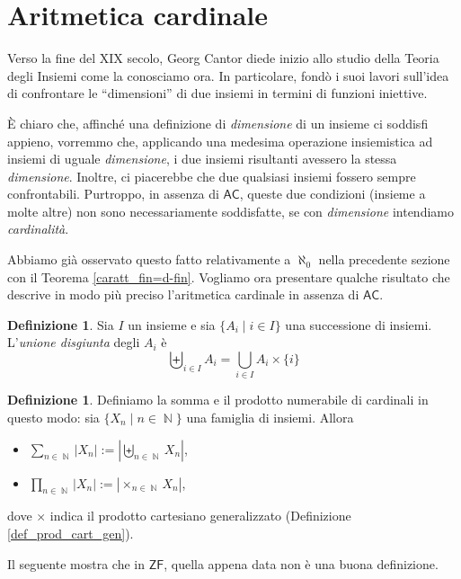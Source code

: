 \documentclass[12pt,a4paper]{report}
\theoremstyle{definition}
\newtheorem{defn}[teo]{Definizione}  %
\theoremstyle{num.custom-title}
\DeclareMathOperator{\N}{\mathbb{N}}
\newcommand{\AC}{\ensuremath{\mathsf{AC}}\xspace}
\newcommand{\ZF}{\ensuremath{\mathsf{ZF}}\xspace}
\begin{document}
\section{Aritmetica cardinale}

Verso la fine del XIX secolo, Georg Cantor diede inizio allo studio della Teoria degli Insiemi come la conosciamo ora. In particolare, fondò i suoi lavori sull'idea di confrontare le ``dimensioni'' di due insiemi in termini di funzioni iniettive.

È chiaro che, affinché una definizione di \emph{dimensione} di un insieme ci soddisfi appieno, vorremmo che, applicando una medesima operazione insiemistica ad insiemi di uguale \emph{dimensione}, i due insiemi risultanti avessero la stessa \emph{dimensione}. Inoltre, ci piacerebbe che due qualsiasi insiemi fossero sempre confrontabili. Purtroppo, in assenza di \AC, queste due condizioni (insieme a molte altre) non sono necessariamente soddisfatte, se con \emph{dimensione} intendiamo \emph{cardinalità}.\

Abbiamo già osservato questo fatto relativamente a $\aleph_0$ nella precedente sezione con il Teorema \ref{caratt_fin=d-fin}. Vogliamo ora presentare qualche risultato che descrive in modo più preciso l'aritmetica cardinale in assenza di \AC. 

\begin{defn}
Sia $I$ un insieme e sia $\{A_i \mid i \in I\}$ una successione di insiemi. L'\emph{unione disgiunta} degli $A_i$ è
\[
\biguplus_{i \in I} A_i = \bigcup_{i \in I} A_i \times \{i\}
\]
\end{defn}

\begin{defn}
Definiamo la somma e il prodotto numerabile di cardinali in questo modo: sia $\{X_n \mid n \in \N\}$ una famiglia di insiemi. Allora
\begin{itemize}
\item $\displaystyle\sum_{n \in \N} |X_n| := |\displaystyle\biguplus_{n \in \N} X_n |$,
\item $\displaystyle\prod_{n \in \N} |X_n| := |\!\times_{n \in \N} X_n |$,
\end{itemize}
dove $\times$ indica il prodotto cartesiano generalizzato (Definizione \ref{def_prod_cart_gen}).
\end{defn}

Il seguente mostra che in \ZF, quella appena data non è una buona definizione.
\end{document}
